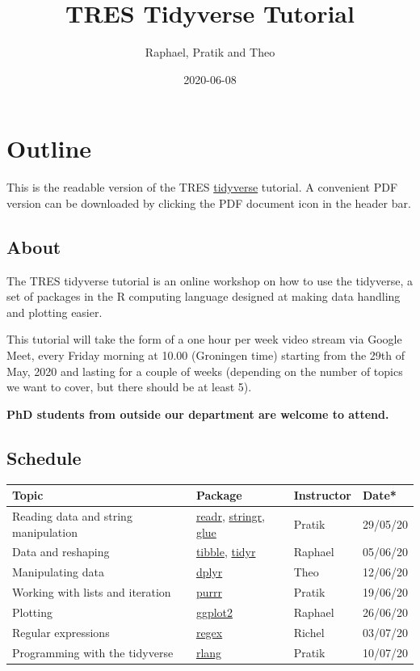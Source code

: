 \documentclass[]{book}
\title{TRES Tidyverse Tutorial}
\author{Raphael, Pratik and Theo}
\date{2020-06-08}
\begin{document}
\maketitle


\linenumbers

{
\setcounter{tocdepth}{1}
\tableofcontents
}
\hypertarget{outline}{%
\chapter*{Outline}\label{outline}}

This is the readable version of the TRES \href{https://www.tidyverse.org/}{tidyverse} tutorial. A convenient PDF version can be downloaded by clicking the PDF document icon in the header bar.

\hypertarget{about}{%
\section*{About}\label{about}}

The TRES tidyverse tutorial is an online workshop on how to use the tidyverse, a set of packages in the R computing language designed at making data handling and plotting easier.

This tutorial will take the form of a one hour per week video stream via Google Meet, every Friday morning at 10.00 (Groningen time) starting from the 29th of May, 2020 and lasting for a couple of weeks (depending on the number of topics we want to cover, but there should be at least 5).

\textbf{PhD students from outside our department are welcome to attend.}

\hypertarget{schedule}{%
\section*{Schedule}\label{schedule}}

\begin{longtable}[]{@{}llll@{}}
\toprule
Topic & Package & Instructor & Date*\tabularnewline
\midrule
\endhead
Reading data and string manipulation & \href{https://readr.tidyverse.org/}{readr}, \href{https://stringr.tidyverse.org/}{stringr}, \href{https://github.com/tidyverse/glue}{glue} & Pratik & 29/05/20\tabularnewline
Data and reshaping & \href{https://tibble.tidyverse.org/}{tibble}, \href{https://tidyr.tidyverse.org/}{tidyr} & Raphael & 05/06/20\tabularnewline
Manipulating data & \href{https://dplyr.tidyverse.org/}{dplyr} & Theo & 12/06/20\tabularnewline
Working with lists and iteration & \href{https://purrr.tidyverse.org/}{purrr} & Pratik & 19/06/20\tabularnewline
Plotting & \href{https://ggplot2.tidyverse.org/}{ggplot2} & Raphael & 26/06/20\tabularnewline
Regular expressions & \href{https://stat.ethz.ch/R-manual/R-devel/library/base/html/regex.html}{regex} & Richel & 03/07/20\tabularnewline
Programming with the tidyverse & \href{https://rlang.r-lib.org/}{rlang} & Pratik & 10/07/20\tabularnewline
\bottomrule
\end{longtable}
\end{document}
